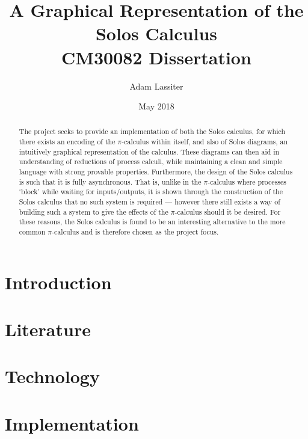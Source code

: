 \documentclass{article}
\title{A Graphical Representation of the Solos Calculus \\
	\large CM30082 Dissertation}
\author{Adam Lassiter}
\date{May 2018}
\begin{document}
    
    \maketitle
    \vspace{\fill}
    \begin{abstract}
        The project seeks to provide an implementation of both the Solos calculus, for which there exists an encoding of the $\pi$-calculus within itself, and also of Solos diagrams, an intuitively graphical representation of the calculus. These diagrams can then aid in understanding of reductions of process calculi, while maintaining a clean and simple language with strong provable properties.
        Furthermore, the design of the Solos calculus is such that it is fully asynchronous. That is, unlike in the $\pi$-calculus where processes `block' while waiting for inputs/outputs, it is shown through the construction of the Solos calculus that no such system is required --- however there still exists a way of building such a system to give the effects of the $\pi$-calculus should it be desired.
        For these reasons, the Solos calculus is found to be an interesting alternative to the more common $\pi$-calculus and is therefore chosen as the project focus.
    \end{abstract}
    \vspace{\fill}
    \pagebreak
    
    \tableofcontents
    \pagebreak

    \section{Introduction}

    \section{Literature}
        
        
        
        
        

    \section{Technology}
        

    \section{Implementation}
\end{document}

